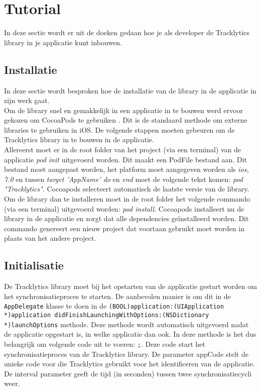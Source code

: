 \chapter{Tutorial}\label{documentatie}
In deze sectie wordt er uit de doeken gedaan hoe je als developer de Tracklytics library in je applicatie kunt inbouwen. 

\section{Installatie}
In deze sectie wordt besproken hoe de installatie van de library in de applicatie in zijn werk gaat. \\

Om de library snel en gemakkelijk in een applicatie in te bouwen werd ervoor gekozen om CocoaPods te gebruiken \cite{CocoaPods}. Dit is de standaard methode om externe libraries te gebruiken in iOS. De volgende stappen moeten gebeuren om de Tracklytics library in te bouwen in de applicatie. \\

\noindent Allereerst moet er in de root folder van het project (via een terminal) van de applicatie \textit{pod init} uitgevoerd worden. Dit maakt een PodFile bestand aan. Dit bestand moet aangepast worden, het platform moet aangegeven worden als \textit{ios, 7.0} en tussen \textit{target 'AppName' do} en \textit{end} moet de volgende tekst komen: \textit{pod "Tracklytics"}. Cocoapods selecteert automatisch de laatste versie van de library. \\

\noindent Om de library dan te installeren moet in de root folder het volgende commando (via een terminal) uitgevoerd worden: \textit{pod install}. Cocoapods installeert nu de library in de applicatie en zorgt dat alle dependencies geïnstalleerd worden. Dit commando genereert een nieuw project dat voortaan gebruikt moet worden in plaats van het andere project.



\section{Initialisatie}
De Tracklytics library moet bij het opstarten van de applicatie gestart worden om het synchronisatieproces te starten. De aanbevolen manier is om dit in de \texttt{\justify AppDelegate} klasse te doen in de \texttt{\justify (BOOL)application:(UIApplication *)application didFinishLaunchingWithOptions:(NSDictionary *)launchOptions} methode. Deze methode wordt automatisch uitgevoerd nadat de applicatie opgestart is, in welke applicatie dan ook. In deze methode is het dus belangrijk om volgende code uit te voeren: \texttt{;}. Deze code start het synchronisatieproces van de Tracklytics library. De parameter appCode stelt de unieke code voor die Tracklytics gebruikt voor het identificeren van de applicatie. De interval parameter geeft de tijd (in seconden) tussen twee synchronisatiecycli weer. 

